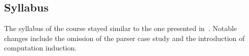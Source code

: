 \subsection{Syllabus}

The syllabus of the course stayed similar to the one presented in~\citep{next_1100}.
Notable changes include the omission of the parser case study
and the introduction of computation induction.


